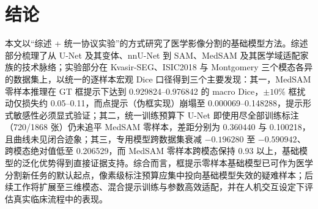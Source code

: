 \documentclass[zihao=-4,a4paper]{ctexart}
\begin{document}
\section{结论}

本文以``综述 + 统一协议实验''的方式研究了医学影像分割的基础模型方法。综述部分梳理了从 U-Net 及其变体、nnU-Net 到 SAM、MedSAM 及其医学域适配家族的技术脉络；实验部分在 Kvasir-SEG、ISIC2018 与 Montgomery 三个模态各异的数据集上，以统一的逐样本宏观 Dice 口径得到三个主要发现：其一，MedSAM 零样本推理在 GT 框提示下达到 0.929824--0.976842 的 macro Dice，$\pm10\%$ 框扰动仅损失约 0.05--0.11，而点提示（伪框实现）崩塌至 0.000069--0.148288，提示形式敏感性必须显式验证；其二，统一训练预算下 U-Net 即使用尽全部训练标注（720/1868 张）仍未追平 MedSAM 零样本，差距分别为 0.360440 与 0.100218，且曲线未见闭合迹象；其三，专用模型跨数据集衰减 $-0.196280$ 至 $-0.590942$、跨模态绝对值低至 0.206529，而 MedSAM 零样本跨模态保持 0.93 以上，基础模型的泛化优势得到直接证据支持。综合而言，框提示零样本基础模型已可作为医学分割新任务的默认起点，像素级标注预算应集中投向基础模型失效的疑难样本；后续工作将扩展至三维模态、混合提示训练与参数高效适配，并在人机交互设定下评估真实临床流程中的表现。



\end{document}
